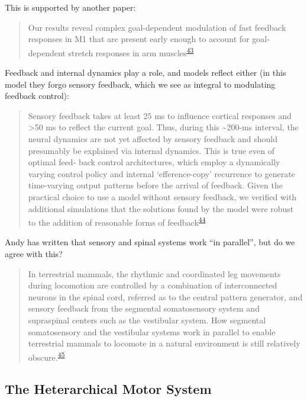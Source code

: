 \documentclass[
  a4paper,
]{article}
\begin{document}
This is supported by another paper:

\begin{quote}
Our results reveal complex goal-dependent modulation of fast feedback
responses in M1 that are present early enough to account for
goal-dependent stretch responses in arm
muscles\textsuperscript{\protect\hyperlink{ref-pruszynski2014}{43}}
\end{quote}

Feedback and internal dynamics play a role, and models reflect either
(in this model they forgo sensory feedback, which we see as integral to
modulating feedback control):

\begin{quote}
Sensory feedback takes at least 25 ms to influence cortical responses
and \textgreater50 ms to reflect the current goal. Thus, during this
\textasciitilde200-ms interval, the neural dynamics are not yet affected
by sensory feedback and should presumably be explained via internal
dynamics. This is true even of optimal feed- back control architectures,
which employ a dynamically varying control policy and internal
`efference-copy' recurrence to generate time-varying output patterns
before the arrival of feedback. Given the practical choice to use a
model without sensory feedback, we verified with additional simulations
that the solutions found by the model were robust to the addition of
reasonable forms of
feedback\textsuperscript{\protect\hyperlink{ref-sussillo2015}{44}}
\end{quote}

Andy has written that sensory and spinal systems work ``in parallel'',
but do we agree with this?

\begin{quote}
In terrestrial mammals, the rhythmic and coordinated leg movements
during locomotion are controlled by a combination of interconnected
neurons in the spinal cord, referred as to the central pattern
generator, and sensory feedback from the segmental somatosensory system
and supraspinal centers such as the vestibular system. How segmental
somatosensory and the vestibular systems work in parallel to enable
terrestrial mammals to locomote in a natural environment is still
relatively
obscure.\textsuperscript{\protect\hyperlink{ref-akayRelativeContributionProprioceptive2021}{45}}
\end{quote}

\hypertarget{the-heterarchical-motor-system}{%
\subsection{The Heterarchical Motor
System}\label{the-heterarchical-motor-system}}
\end{document}
